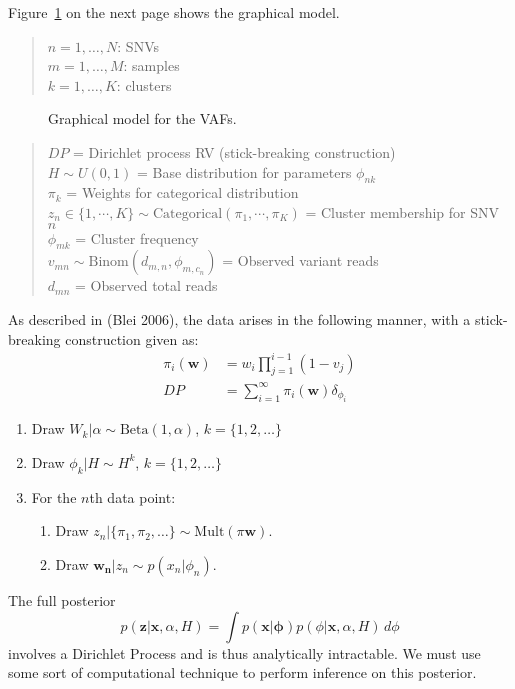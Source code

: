 \documentclass[11pt]{article}
\newcommand{\bx}{\ensuremath{\mathbf{x}}}
\newcommand{\bz}{\ensuremath{\mathbf{z}}}
\newcommand{\adjustimg}{%
  \checkoddpage%
  \ifoddpage\hspace*{\dimexpr\evensidemargin-\oddsidemargin}\else\hspace*{-\dimexpr\evensidemargin-\oddsidemargin}\fi%
}
\newcommand{\centerimg}[2][width=\textwidth]{%
  \makebox[\textwidth]{\adjustimg\texttt{[image: \#2]}}%
}
\begin{document}
Figure~\ref{fig:GM} on the next page shows the graphical model.

\newpage
\begin{quote}
$n = 1, \ldots , N$:  SNVs \\
$m = 1, \ldots , M$: samples \\
$k = 1, \ldots ,  K$: clusters
\end{quote}

\begin{figure}[H]
\centerimg[scale=1.0]{multi_pgm.png}
\caption{Graphical model for the VAFs.}
\label{fig:GM}
\end{figure}

\begin{quote}
$DP$ = Dirichlet process RV (stick-breaking construction) \\
$H \sim U(0,1)$ = Base distribution for parameters $\phi_{nk}$	 \\
$\pi_k$ = Weights for categorical distribution \\
$z_{n} \in \{1, \cdots, K\}  \sim \mathrm{Categorical}(\pi_1, \cdots, \pi_K)$ =  Cluster membership for SNV $n$\\
$\phi_{mk}$ = Cluster frequency \\ 
$v_{mn} \sim \mathrm{Binom}(d_{m,n}, \phi_{m,c_n})$ = Observed variant reads\\ 
$d_{mn}$ = Observed total reads
\end{quote}
\vspace{0.05cm}

As described in (Blei 2006), the data arises in the following manner, with a stick-breaking construction given as:
\begin{align*}
\pi_i(\mathbf{w}) &= w_i \prod\limits_{j=1}^{i-1} (1 - v_j) \\
				DP &= \sum_{i=1}^\infty \pi_i(\mathbf{w}) \delta_{\phi_i}
\end{align*}
\begin{enumerate}
	\item Draw $W_k | \alpha \sim \mathrm{Beta}(1, \alpha)$, \hspace{1cm} $k = \{1, 2, \ldots\}$
	\item Draw $\phi_k | H \sim H^k$, \hspace{1cm} $k = \{1, 2, \ldots\}$
	\item For the $n$th data point:
	\begin{enumerate}
		\item Draw $z_n | \{\pi_1, \pi_2, \ldots\} \sim \mathrm{Mult}(\pi{\mathbf{w}})$.
		\item Draw $\mathbf{w_n} | z_n \sim p(x_n | \phi_n)$.
	\end{enumerate}
\end{enumerate}
\vspace{0.05cm}
The full posterior 
\begin{equation}
p(\bz | \bx, \alpha, H) = \int p(\bx | \mathbf{\phi}) p(\phi | \bx, \alpha, H) \, d\phi
\end{equation}
involves a Dirichlet Process and is thus analytically intractable. We must use some sort of computational technique to perform inference on this posterior.
\end{document}
